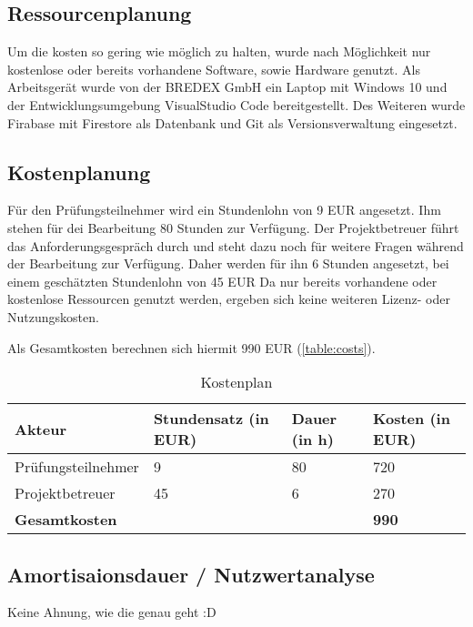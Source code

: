 \documentclass[12pt]{article}
\begin{document}
\subsection{Ressourcenplanung}
Um die kosten so gering wie möglich zu halten, wurde nach Möglichkeit nur
kostenlose oder bereits vorhandene Software, sowie Hardware genutzt.
Als Arbeitsgerät wurde von der BREDEX GmbH ein Laptop mit Windows 10 und der
Entwicklungsumgebung VisualStudio Code bereitgestellt.
Des Weiteren wurde Firabase mit Firestore als Datenbank und Git als 
Versionsverwaltung eingesetzt.

\subsection{Kostenplanung}
Für den Prüfungsteilnehmer wird ein Stundenlohn von 9 EUR angesetzt.
Ihm stehen für dei Bearbeitung 80 Stunden zur Verfügung.
Der Projektbetreuer führt das Anforderungsgespräch durch und steht 
dazu noch für weitere Fragen während der Bearbeitung zur Verfügung.
Daher werden für ihn 6 Stunden angesetzt, bei einem geschätzten 
Stundenlohn von 45 EUR
Da nur bereits vorhandene oder kostenlose Ressourcen genutzt werden,
ergeben sich keine weiteren Lizenz- oder Nutzungskosten.

Als Gesamtkosten berechnen sich hiermit 990 EUR (\autoref{table:costs}).

\begin{table}[H]
    \centering
    \begin{tabular}{|l|l|l|l|}
        \hline
        Akteur & Stundensatz (in EUR) & Dauer (in h) & Kosten (in EUR) \\
        \hline
        Prüfungsteilnehmer & 9 & 80 & 720 \\
        Projektbetreuer & 45 & 6 & 270 \\
        \hline
        \textbf{Gesamtkosten} &&& \textbf{990} \\
        \hline
        
    \end{tabular}
    \caption{Kostenplan}
    \label{table:costs}
\end{table}


\subsection{Amortisaionsdauer / Nutzwertanalyse}

Keine Ahnung, wie die genau geht :D
\end{document}
